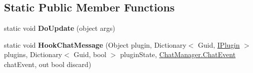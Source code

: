 \subsection*{Static Public Member Functions}
\begin{DoxyCompactItemize}
\item 
\hypertarget{class_s_e_mod_a_p_i_extensions_1_1_a_p_i_1_1_plugin_manager_ac1a6abdac77bf9b4d3f0264cd23cbf5e}{}static void {\bfseries Do\+Update} (object args)\label{class_s_e_mod_a_p_i_extensions_1_1_a_p_i_1_1_plugin_manager_ac1a6abdac77bf9b4d3f0264cd23cbf5e}

\item 
\hypertarget{class_s_e_mod_a_p_i_extensions_1_1_a_p_i_1_1_plugin_manager_a1772f3fc3ffbf6547e6618b00a9d4d7c}{}static void {\bfseries Hook\+Chat\+Message} (Object plugin, Dictionary$<$ Guid, \hyperlink{interface_s_e_mod_a_p_i_extensions_1_1_a_p_i_1_1_plugin_1_1_i_plugin}{I\+Plugin} $>$ plugins, Dictionary$<$ Guid, bool $>$ plugin\+State, \hyperlink{struct_s_e_mod_a_p_i_extensions_1_1_a_p_i_1_1_chat_manager_1_1_chat_event}{Chat\+Manager.\+Chat\+Event} chat\+Event, out bool discard)\label{class_s_e_mod_a_p_i_extensions_1_1_a_p_i_1_1_plugin_manager_a1772f3fc3ffbf6547e6618b00a9d4d7c}

\end{DoxyCompactItemize}
